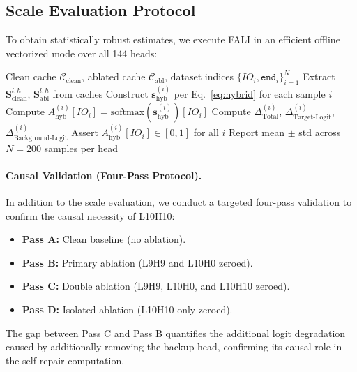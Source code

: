 \documentclass[12pt,a4paper]{article}
\begin{document}
\subsection{Scale Evaluation Protocol}
\label{subsec:scale}

To obtain statistically robust estimates, we execute FALI in an efficient
offline vectorized mode over all 144 heads:

\begin{algorithm}[!htbp]
\caption{Vectorized FALI Across All Heads}
\begin{algorithmic}[1]
  \Require Clean cache $\mathcal{C}_\text{clean}$, ablated cache $\mathcal{C}_\text{abl}$,
           dataset indices $\{IO_i, \texttt{end}_i\}_{i=1}^N$
      \State Extract $\mathbf{S}^{l,h}_\text{clean}$, $\mathbf{S}^{l,h}_\text{abl}$ from caches
      \State Construct $\mathbf{s}^{(i)}_\text{hyb}$ per Eq.~\ref{eq:hybrid} for each sample $i$
      \State Compute $A^{(i)}_\text{hyb}[IO_i] = \text{softmax}(\mathbf{s}^{(i)}_\text{hyb})[IO_i]$
      \State Compute $\Delta^{(i)}_\text{Total}$, $\Delta^{(i)}_\text{Target-Logit}$, $\Delta^{(i)}_\text{Background-Logit}$
      \State Assert $A^{(i)}_\text{hyb}[IO_i] \in [0, 1]$ for all $i$
    \EndFor
  \EndFor
  \State Report mean $\pm$ std across $N=200$ samples per head
\end{algorithmic}
\end{algorithm}

\paragraph{Causal Validation (Four-Pass Protocol).} In addition to the
scale evaluation, we conduct a targeted four-pass validation to confirm the
causal necessity of L10H10:
\begin{itemize}
  \item \textbf{Pass A:} Clean baseline (no ablation).
  \item \textbf{Pass B:} Primary ablation (L9H9 and L10H0 zeroed).
  \item \textbf{Pass C:} Double ablation (L9H9, L10H0, and L10H10 zeroed).
  \item \textbf{Pass D:} Isolated ablation (L10H10 only zeroed).
\end{itemize}
The gap between Pass C and Pass B quantifies the additional logit degradation
caused by additionally removing the backup head, confirming its causal role in
the self-repair computation.
\end{document}
